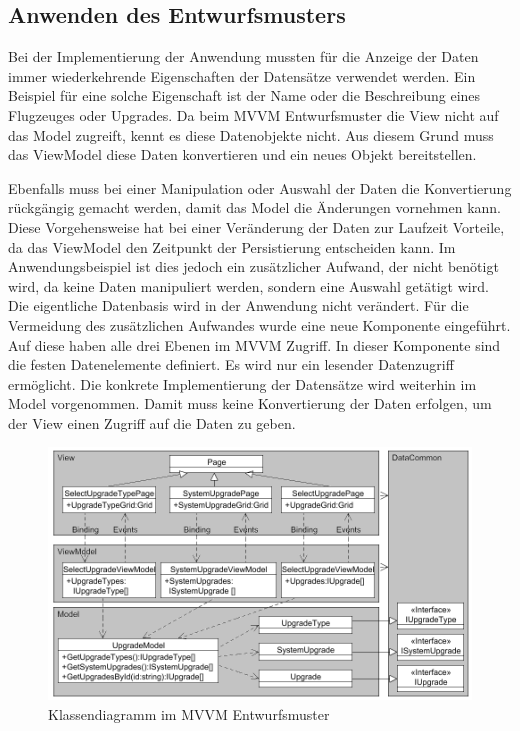 \subsection{Anwenden des Entwurfsmusters}
Bei der Implementierung der Anwendung mussten für die Anzeige der Daten immer wiederkehrende Eigenschaften der Datensätze verwendet werden. Ein Beispiel für eine solche Eigenschaft ist der Name oder die Beschreibung eines Flugzeuges oder Upgrades. Da beim MVVM Entwurfsmuster die View nicht auf das Model zugreift, kennt es diese Datenobjekte nicht. Aus diesem Grund muss das ViewModel diese Daten konvertieren und ein neues Objekt bereitstellen. 

Ebenfalls muss bei einer Manipulation oder Auswahl der Daten die Konvertierung rückgängig gemacht werden, damit das Model die Änderungen vornehmen kann. Diese Vorgehensweise hat bei einer Veränderung der Daten zur Laufzeit Vorteile, da das ViewModel den Zeitpunkt der Persistierung entscheiden kann. Im Anwendungsbeispiel ist dies jedoch ein zusätzlicher Aufwand, der nicht benötigt wird, da keine Daten manipuliert werden, sondern eine Auswahl getätigt wird. Die eigentliche Datenbasis wird in der Anwendung nicht verändert.
Für die Vermeidung des zusätzlichen Aufwandes wurde eine neue Komponente eingeführt. Auf diese haben alle drei Ebenen im MVVM Zugriff. In dieser Komponente sind die festen Datenelemente definiert. Es wird nur ein lesender Datenzugriff ermöglicht. Die konkrete Implementierung der Datensätze wird weiterhin im Model vorgenommen. Damit muss keine Konvertierung der Daten erfolgen, um der View einen Zugriff auf die Daten zu geben. \par 
\begin{figure}
\centering
\includegraphics[width=\hsize]{images/uml_diagramm}
\caption{Klassendiagramm im MVVM Entwurfsmuster}
\label{mvvmApp}
\end{figure}
